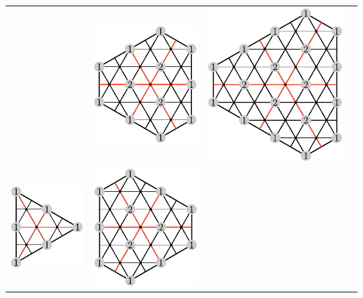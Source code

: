 \documentclass[11pt,oneside]{article}
\begin{document}
\begin{center}
\begin{tabular}{ c c c c }
& \includegraphics[scale=0.6]{images/sl3_weights_12.pdf}
& \includegraphics[scale=0.6]{images/sl3_weights_13.pdf} \\
  \includegraphics[scale=0.6]{images/sl3_weights_20.pdf}
& \includegraphics[scale=0.6]{images/sl3_weights_21.pdf}

\end{tabular}
\end{center}
\end{document}
